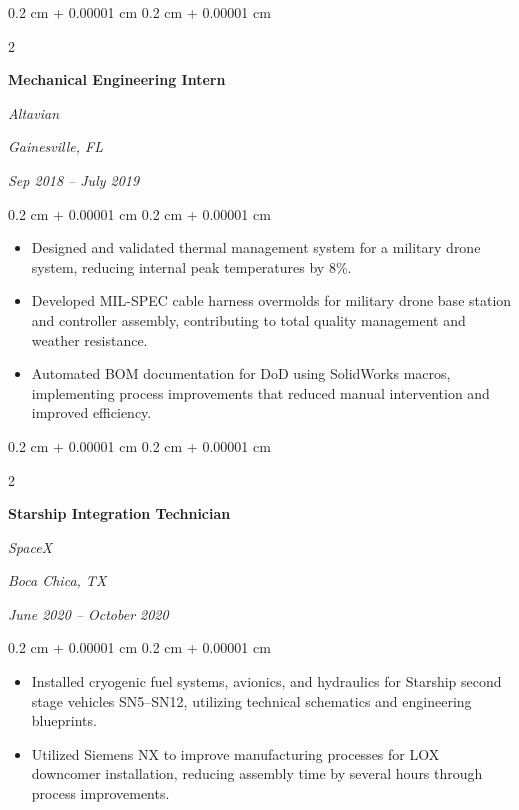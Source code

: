 \documentclass[10pt, letterpaper]{article}
\newenvironment{highlights}{
    \begin{itemize}[
        topsep=0.10 cm,
        parsep=0.10 cm,
        partopsep=0pt,
        itemsep=0pt,
        leftmargin=0.4 cm + 10pt
    ]
}{
    \end{itemize}
} %
\newenvironment{onecolentry}{
    \begin{adjustwidth}{
        0.2 cm + 0.00001 cm
    }{
        0.2 cm + 0.00001 cm
    }
}{
    \end{adjustwidth}
} %
\newenvironment{twocolentry}[2][]{
    \onecolentry
    \def\secondColumn{#2}
    \setcolumnwidth{\fill, 4.5 cm}
    \begin{paracol}{2}
}{
    \switchcolumn \raggedleft \secondColumn
    \end{paracol}
    \endonecolentry
} %
\begin{document}
        \vspace{0.35 cm}

        \begin{twocolentry}{
        \textit{Gainesville, FL}    
            
        \textit{Sep 2018 – July 2019}}
            \textbf{Mechanical Engineering Intern}
            
            \textit{Altavian}
        \end{twocolentry}

        \vspace{0.10 cm}
        \begin{onecolentry}
            \begin{highlights}
                \item Designed and validated thermal management system for a military drone system, reducing internal peak temperatures by 8\%.
                \item Developed MIL-SPEC cable harness overmolds for military drone base station and controller assembly, contributing to total quality management and weather resistance.
                \item Automated BOM documentation for DoD using SolidWorks macros, implementing process improvements that reduced manual intervention and improved efficiency.
            \end{highlights}
        \end{onecolentry}

        \vspace{0.35 cm}

        \begin{twocolentry}{
        \textit{Boca Chica, TX}    
            
        \textit{June 2020 – October 2020}}
            \textbf{Starship Integration Technician}
            
            \textit{SpaceX}
        \end{twocolentry}

        \vspace{0.10 cm}
        \begin{onecolentry}
            \begin{highlights}
                \item Installed cryogenic fuel systems, avionics, and hydraulics for Starship second stage vehicles SN5–SN12, utilizing technical schematics and engineering blueprints.
                \item Utilized Siemens NX to improve manufacturing processes for LOX downcomer installation, reducing assembly time by several hours through process improvements.
            \end{highlights}
        \end{onecolentry}
\end{document}
